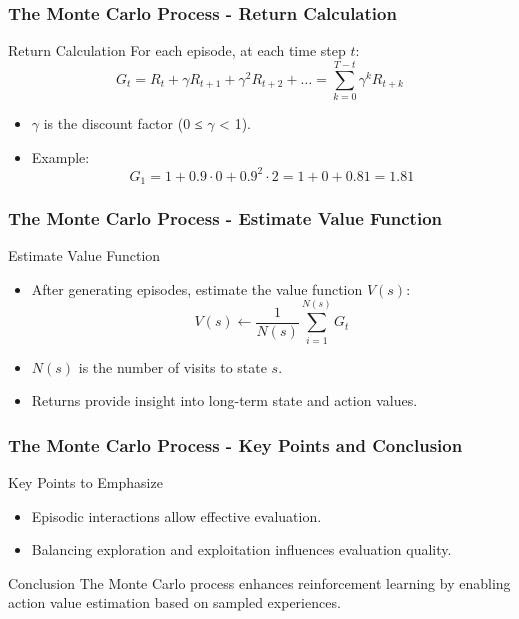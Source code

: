 \documentclass[aspectratio=169]{beamer}
\begin{document}
\begin{frame}[fragile]
    \frametitle{The Monte Carlo Process - Return Calculation}
    \begin{block}{Return Calculation}
        For each episode, at each time step \( t \):
        \begin{equation}
        G_t = R_t + \gamma R_{t+1} + \gamma^2 R_{t+2} + \ldots = \sum_{k=0}^{T-t} \gamma^k R_{t+k}
        \end{equation}
    \end{block}
    
    \begin{itemize}
        \item \( \gamma \) is the discount factor (0 ≤ \( \gamma \) < 1).
        \item Example: 
        \[
        G_1 = 1 + 0.9 \cdot 0 + 0.9^2 \cdot 2 = 1 + 0 + 0.81 = 1.81
        \]
    \end{itemize}
\end{frame}

\begin{frame}[fragile]
    \frametitle{The Monte Carlo Process - Estimate Value Function}
    \begin{block}{Estimate Value Function}
        \begin{itemize}
            \item After generating episodes, estimate the value function \( V(s) \):
            \begin{equation}
            V(s) \leftarrow \frac{1}{N(s)} \sum_{i=1}^{N(s)} G_t
            \end{equation}
            \item \( N(s) \) is the number of visits to state \( s \).
        \end{itemize}
    \end{block}
    
    \begin{itemize}
        \item Returns provide insight into long-term state and action values.
    \end{itemize}
\end{frame}

\begin{frame}[fragile]
    \frametitle{The Monte Carlo Process - Key Points and Conclusion}
    \begin{block}{Key Points to Emphasize}
        \begin{itemize}
            \item Episodic interactions allow effective evaluation.
            \item Balancing exploration and exploitation influences evaluation quality.
        \end{itemize}
    \end{block}
    
    \begin{block}{Conclusion}
        The Monte Carlo process enhances reinforcement learning by enabling action value estimation based on sampled experiences.
    \end{block}
\end{frame}
\end{document}
